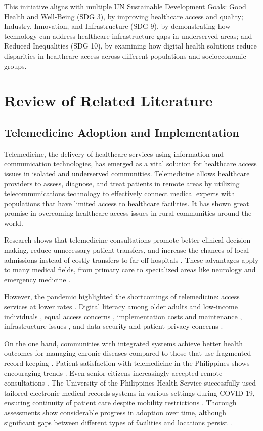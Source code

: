 \documentclass[12pt]{report}
\begin{document}
This initiative aligns with multiple UN Sustainable Development Goals: Good
Health and Well-Being (SDG 3), by improving healthcare access and quality;
Industry, Innovation, and Infrastructure (SDG 9), by demonstrating how
technology can address healthcare infrastructure gaps in underserved areas;
and Reduced Inequalities (SDG 10), by examining how digital health solutions
reduce disparities in healthcare access across different populations and
socioeconomic groups.

\section*{Review of Related Literature}

\subsection*{Telemedicine Adoption and Implementation}

Telemedicine, the delivery of healthcare services using information and
communication technologies, has emerged as a vital solution for healthcare
access issues in isolated and underserved communities. Telemedicine allows
healthcare providers to assess, diagnose, and treat patients in remote areas
by utilizing telecommunications technology to effectively connect medical
experts with populations that have limited access to healthcare facilities.
It has shown great promise in overcoming healthcare access issues in rural
communities around the world.

Research shows that telemedicine consultations promote better clinical
decision-making, reduce unnecessary patient transfers, and increase the chances
of local admissions instead of costly transfers to far-off hospitals
\cite{ref30, ref27}. These advantages apply to many medical fields, from
primary care to specialized areas like neurology and emergency medicine
\cite{ref15}.

However, the pandemic highlighted the shortcomings of telemedicine: access
services at lower rates \cite{ref10, ref21}. Digital literacy among older
adults and low-income individuals \cite{ref1, ref46}, equal access concerns
\cite{ref16, ref12, ref6}, implementation costs and maintenance \cite{ref43,
ref9}, infrastructure issues \cite{ref31, ref48, ref62}, and data security and
patient privacy concerns \cite{ref41}.

On the one hand, communities with integrated systems achieve better health
outcomes for managing chronic diseases compared to those that use fragmented
record-keeping \cite{ref32}. Patient satisfaction with telemedicine in the
Philippines shows encouraging trends \cite{ref32, ref39}. Even senior citizens
increasingly accepted remote consultations \cite{ref7}. The University of the
Philippines Health Service successfully used tailored electronic medical records
systems in various settings during COVID-19, ensuring continuity of patient
care despite mobility restrictions \cite{ref36, ref59}. Thorough assessments
show considerable progress in adoption over time, although significant gaps
between different types of facilities and locations persist \cite{ref3, ref38}.
\end{document}

